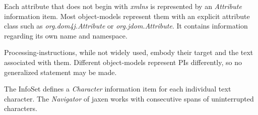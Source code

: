 \documentclass[20pt,landscape,headrule,footrule]{foils}
\begin{document}





Each attribute that does not begin with \emph{xmlns} is represented
by an \emph{Attribute} information item.  Most object-models represent them
with an explicit attribute class such as \emph{org.dom4j.Attribute}
or \emph{org.jdom.Attribute}.  It contains information regarding
its own name and namespace.

\begin{codelisting}
\end{codelisting}



Processing-instructions, while not widely used, embody their target
and the text associated with them.  Different object-models represent
PIs differently, so no generalized statement may be made.

\begin{codelisting}
\end{codelisting}



The InfoSet defines a \emph{Character} information item for each individual
text character.  The \emph{Navigator} of jaxen works with
consecutive spans of uninterrupted characters.

\begin{codelisting}
\end{codelisting}
\end{document}
